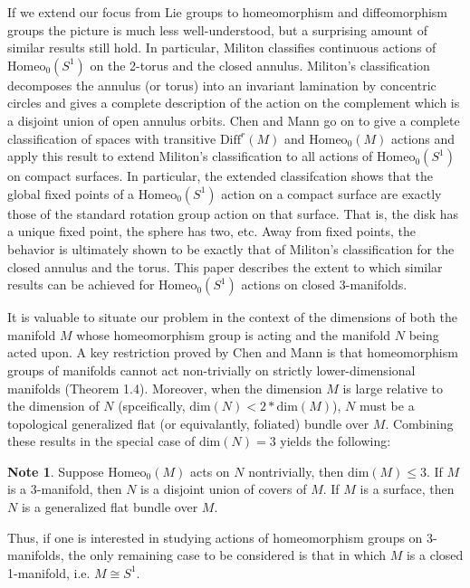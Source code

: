 \documentclass[10pt, oneside]{article}
\newcommand{\homeo}[1][S^1]{\text{Homeo}_0(#1)}
\newcommand{\diffr}[1][M]{\text{Diff}^r(#1)}
\newcommand{\dimn}[1]{\text{dim}(#1)}
\theoremstyle{definition}
\newtheorem*{note*}{Note}
\theoremstyle{definition}
\begin{document}
If we extend our focus from Lie groups to homeomorphism and diffeomorphism groups the picture is much less well-understood, but a surprising amount of similar results still hold. In particular, Militon \cite{militon:ActionsGroup} classifies continuous actions of $\homeo$ on the 2-torus and the closed annulus. Militon's classification decomposes the annulus (or torus) into an invariant lamination by concentric circles and gives a complete description of the action on the complement which is a disjoint union of open annulus orbits. Chen and Mann \cite{chen:StructureTheorems} go on to give a complete classification of spaces with transitive $\diffr$ and $\homeo[M]$ actions and apply this result to extend Militon's classification to all actions of $\homeo$ on compact surfaces. In particular, the extended classifcation shows that the global fixed points of a $\homeo$ action on a compact surface are exactly those of the standard rotation group action on that surface. That is, the disk has a unique fixed point, the sphere has two, etc. Away from fixed points, the behavior is ultimately shown to be exactly that of Militon's classification for the closed annulus and the torus. This paper describes the extent to which similar results can be achieved for $\homeo$ actions on closed 3-manifolds.

It is valuable to situate our problem in the context of the dimensions of both the manifold $M$ whose homeomorphism group is acting and the manifold $N$ being acted upon. A key restriction proved by Chen and Mann \cite{chen:StructureTheorems} is that homeomorphism groups of manifolds cannot act non-trivially on strictly lower-dimensional manifolds (Theorem 1.4). Moreover, when the dimension $M$ is large relative to the dimension of $N$ (spceifically, $\dimn{N} < 2*\dimn{M}$), $N$ must be a topological generalized flat (or equivalantly, foliated) bundle over $M$. Combining these results in the special case of $\dimn{N} = 3$ yields the following:
\begin{note*}
    Suppose $\homeo[M]$ acts on $N$ nontrivially, then $\dimn{M}\leq 3$. If $M$ is a 3-manifold, then $N$ is a disjoint union of covers of $M$. If $M$ is a surface, then $N$ is a generalized flat bundle over $M$. 
\end{note*}
\noindent Thus, if one is interested in studying actions of homeomorphism groups on 3-manifolds, the only remaining case to be considered is that in which $M$ is a closed 1-manifold, i.e. $M\cong S^1$. 
\end{document}
